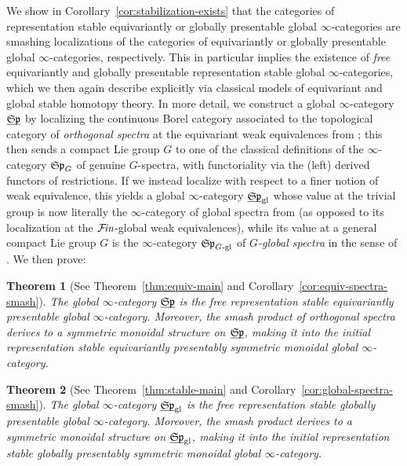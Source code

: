 \documentclass[reqno]{memo-l}
\theoremstyle{mythm}
\newtheorem{introthm}{Theorem}
\theoremstyle{definition}
\numberwithin{equation}{section}
\newcommand{\gl}{\textup{gl}}
\newcommand{\Fin}{\hbox{$\mathcal F\kern-1.7pt\textit{in}$}}
\newcommand{\ulhelper}[2]{\underline{\setbox0=\hbox{$#1#2$}\dp0=0.4pt \box0\relax}}
\newcommand{\ul}[1]{{\mathpalette\ulhelper{#1}}\hbox{\rule[-2pt]{0pt}{0pt}}}
\newcommand{\mySp}{{\mathfrak S\kern-.5pt\mathfrak p}}
\begin{document}
We show in Corollary~\ref{cor:stabilization-exists} that the categories of representation stable equivariantly or globally presentable global $\infty$-categories are smashing localizations of the categories of equivariantly or globally presentable global $\infty$-categories, respectively. This in particular implies the existence of \emph{free} equivariantly and globally presentable representation stable global $\infty$-categories, which we then again describe explicitly via classical models of equivariant and global stable homotopy theory. In more detail, we construct a global $\infty$-category $\ul\mySp$ by localizing the continuous Borel category associated to the topological category of \emph{orthogonal spectra} \cite{MMSS} at the equivariant weak equivalences from \cite{mandell-may}; this then sends a compact Lie group $G$ to one of the classical definitions of the $\infty$-category $\mySp_G$ of genuine $G$-spectra, with functoriality via the (left) derived functors of restrictions. If we instead localize with respect to a finer notion of weak equivalence, this yields a global $\infty$-category $\ul\mySp_\gl$ whose value at the trivial group is now literally the $\infty$-category of global spectra from \cite{schwede2018global} (as opposed to its localization at the $\Fin$-global weak equivalences), while its value at a general compact Lie group $G$ is the $\infty$-category $\mySp_\text{$G$-gl}$ of \emph{$G$-global spectra} in the sense of \cite{schwede-stiefel}. We then prove:

\begin{introthm}[See Theorem~\ref{thm:equiv-main} and Corollary~\ref{cor:equiv-spectra-smash}]\label{introthm:stable-equiv-main}
    The global $\infty$-category $\ul\mySp$ is the free representation stable equivariantly presentable global $\infty$-category. Moreover, the smash product of orthogonal spectra derives to a symmetric monoidal structure on $\ul\mySp$, making it into the initial representation stable equivariantly presentably symmetric monoidal global $\infty$-category.
\end{introthm}

\begin{introthm}[See Theorem~\ref{thm:stable-main} and Corollary~\ref{cor:global-spectra-smash}]\label{introthm:stable-main}
    The global $\infty$-category $\ul\mySp_\gl$ is the free representation stable globally presentable global $\infty$-category. Moreover, the smash product derives to a symmetric monoidal structure on $\ul\mySp_\gl$, making it into the initial representation stable globally presentably symmetric monoidal global $\infty$-category.
\end{introthm}
\end{document}
